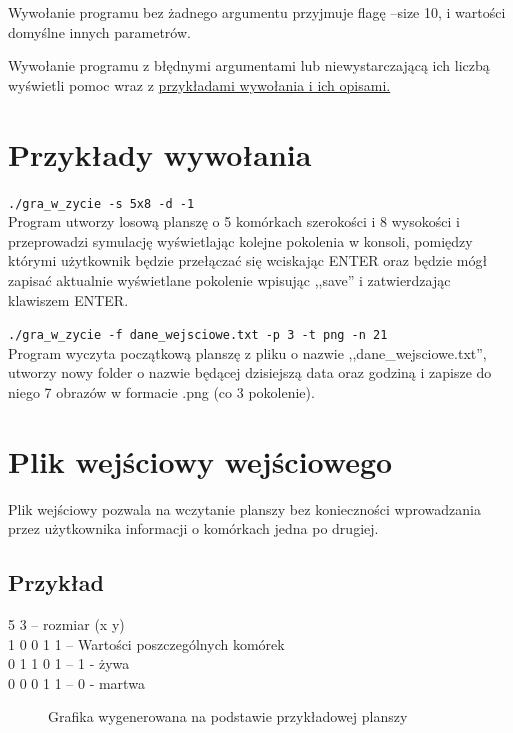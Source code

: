 \documentclass{report}
\begin{document}
Wywołanie programu bez żadnego argumentu przyjmuje flagę --size 10, i wartości domyślne innych parametrów.

Wywołanie programu z błędnymi argumentami lub niewystarczającą ich liczbą wyświetli pomoc wraz z   \hyperref[przykłady]{\textcolor{LinkColor}{przykładami wywołania i ich opisami.}}

\section{Przykłady wywołania}  \label{przykłady}
\texttt{./gra_w_zycie -s 5x8 -d -1} \\
Program utworzy losową planszę o 5 komórkach szerokości i 8 wysokości i przeprowadzi symulację wyświetlając kolejne pokolenia w konsoli, pomiędzy którymi użytkownik będzie przełączać się wciskając ENTER oraz będzie mógł zapisać aktualnie wyświetlane pokolenie wpisując ,,save'' i zatwierdzając klawiszem ENTER.

\texttt{./gra_w_zycie -f dane_wejsciowe.txt -p 3 -t png -n 21}\\
Program wyczyta początkową planszę z pliku o nazwie ,,dane_wejsciowe.txt'', utworzy nowy folder o nazwie będącej dzisiejszą data oraz godziną i zapisze do niego 7 obrazów w formacie .png (co 3 pokolenie). 


\section{Plik wejściowy wejściowego}  \label{format}
Plik wejściowy pozwala na wczytanie planszy bez konieczności wprowadzania przez użytkownika informacji o komórkach jedna po drugiej.

\subsection{Przykład}
5 3 \tab -- rozmiar (x y) \\
1 0 0 1 1 \tab -- Wartości poszczególnych komórek \\
0 1 1 0 1 \tab -- 1 - żywa \\
0 0 0 1 1 \tab -- 0 - martwa \\

\begin{figure}[h]
\centering
\setlength{\fboxsep}{0pt} %
\setlength{\fboxrule}{1pt} %
\caption{Grafika wygenerowana na podstawie przykładowej planszy}
\end{figure}
\end{document}
